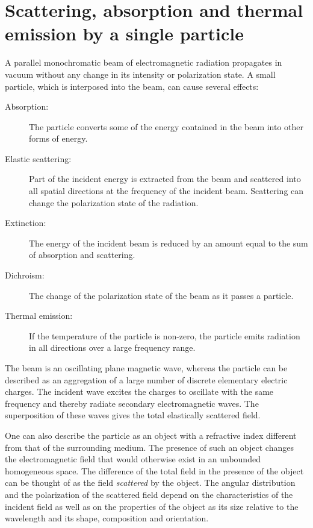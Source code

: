 \section[Single particle scattering]{Scattering, absorption and thermal emission by a single particle}
\label{sec:rtetheory:theory_single_part}

A parallel monochromatic beam of electromagnetic radiation propagates
in vacuum without any change in its intensity or polarization state. A
small particle, which is interposed into the beam, can cause several
effects:
\begin{description}
\item[Absorption:] The particle converts some of the energy
  contained in the beam into other forms of energy.
\item[Elastic scattering:] Part of the incident energy is
  extracted from the beam and scattered into all spatial directions at
  the frequency of the incident beam. Scattering can change the
  polarization state of the radiation.
\item[Extinction:] The energy of the incident beam is reduced by
  an amount equal to the sum of absorption and scattering.
\item[Dichroism:] The change of the polarization state of the beam
  as it passes a particle.
\item[Thermal emission:] If the temperature of the particle is
  non-zero, the particle emits radiation in all directions over a
  large frequency range.
\end{description}
The beam is an oscillating plane magnetic wave, whereas the particle
can be described as an aggregation of a large number of discrete
elementary electric charges. The incident wave excites the charges to
oscillate with the same frequency and thereby radiate secondary
electromagnetic waves. The superposition of these waves gives the
total elastically scattered field.

One can also describe the particle as an object with a refractive
index different from that of the surrounding medium. The presence of
such an object changes the electromagnetic field that would otherwise
exist in an unbounded homogeneous space. The difference of the total
field in the presence of the object can be thought of as the field
\emph{scattered} by the object. The angular distribution and the
polarization of the scattered field depend on the characteristics of
the incident field as well as on the properties of the object as its
size relative to the wavelength and its shape, composition and
orientation.


